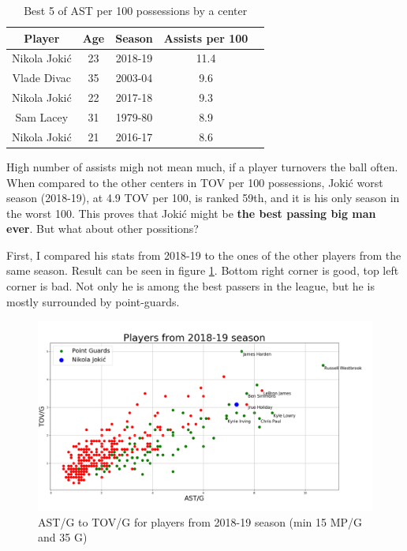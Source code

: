 \documentclass[a4paper]{article}
\begin{document}
\begin{table}[h!]
\begin{center}
\begin{tabular}{|c|c|c|c|c|} \hline
\textbf{Player} & \textbf{Age} & \textbf{Season} & \textbf{Assists per 100} \\ \hline
Nikola Jokić & 23 & 2018-19 & 11.4 \\ \hline
Vlade Divac & 35 & 2003-04 & 9.6 \\ \hline
Nikola Jokić & 22 & 2017-18 & 9.3 \\ \hline
Sam Lacey & 31 & 1979-80 & 8.9 \\ \hline
Nikola Jokić & 21 & 2016-17 & 8.6 \\ \hline
\end{tabular}
\caption{Best 5 of AST per 100 possessions by a center}
\label{tab:centers_ast_per100_top5}
\end{center}
\end{table}

High number of assists migh not mean much, if a player turnovers the ball often. When compared to the other centers in TOV per 100 possessions, Joki\' c worst season (2018-19), at 4.9 TOV per 100, is ranked 59th, and it is his only season in the worst 100. This proves that Joki\' c might be \textbf{the best passing big man ever}. But what about other possitions?

First, I compared his stats from 2018-19 to the ones of the other players from the same season. Result can be seen in figure \ref{plt:ast_tov_g}. Bottom right corner is good, top left corner is bad. Not only he is among the best passers in the league, but he is mostly surrounded by point-guards.

\begin{figure}[h!]
\begin{center}
\includegraphics[scale=0.30]{ast_tov_g_2019.png}
\end{center}
\caption{AST/G to TOV/G for players from 2018-19 season (min 15 MP/G and 35 G)}
\label{plt:ast_tov_g}
\end{figure}
\end{document}
